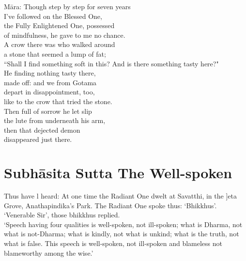 \begin{MyDescription}[]{M\=ara:}
Though step by step for seven years\\
I've followed on the Blessed One,\\
the Fully Enlightened One, possessed\\
of mindfulness, he gave to me no chance.\\
A crow there was who walked around\\
a stone that seemed a lump of fat;\\
``Shall I find something soft in this?
And is there something tasty here?"\\
He finding nothing tasty there,\\
made off: and we from Gotama\\
depart in disappointment, too,\\
like to the crow that tried the stone.\\
Then full of sorrow he let slip\\
the lute from underneath his arm,\\
then that dejected demon\\
disappeared just there.
\end{MyDescription}

\begin{MyDescription}[(Sn. 425-449)]{}

\end{MyDescription}
\chapter{Subh\=asita Sutta The Well-spoken}

Thus have l heard:
At one time the Radiant One dwelt at Savatthi, in the ]eta Grove, Anathapindika's Park. The Radiant One spoke thus: `Bhikkhus'.\\
`Venerable Sir', those bhikkhus replied.\\
`Speech having four qualities is well-spoken, not ill-spoken; what is Dharma, not what is not-Dharma; what is kindly, not what is unkind; what is the truth, not what is false. This speech is well-spoken, not ill-spoken and blameless not blameworthy among the wise.'\\

